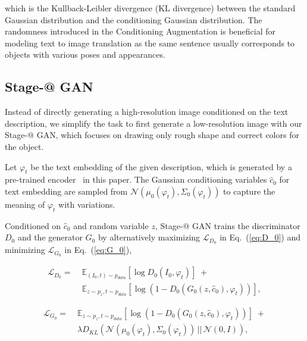 which is the Kullback-Leibler divergence (KL divergence) between the standard Gaussian distribution and the conditioning Gaussian distribution. The randomness introduced in the Conditioning Augmentation is beneficial for modeling text to image translation as the same sentence usually corresponds to objects with various poses and appearances. 

\subsection{Stage-\expandafter\@slowromancap{}@ GAN}

Instead of directly generating a high-resolution image conditioned on the text description, we simplify the task to first generate a low-resolution image with our Stage-\expandafter\@slowromancap{}@ GAN, which focuses on drawing only rough shape and correct colors for the object. 

Let $\varphi_{t}$ be the text embedding of the given description, which is generated by a pre-trained encoder~\cite{reed2016cvpr} in this paper. The Gaussian conditioning variables $\hat{c}_0$ for text embedding are sampled from $\mathcal{N}(\mu_0(\varphi_{t}), \Sigma_0(\varphi_{t}))$ to capture the meaning of $\varphi_{t}$ with variations. 

Conditioned on $\hat{c}_0$ and random variable $z$, Stage-\expandafter\@slowromancap{}@ GAN trains the discriminator $D_0$ and the generator $G_0$ by alternatively maximizing $\mathcal{L}_{D_0}$ in Eq.~(\ref{eq:D_0}) and minimizing $\mathcal{L}_{G_0}$ in Eq.~(\ref{eq:G_0}),

\begin{equation}\label{eq:D_0}
\begin{aligned}
\mathcal{L}_{D_0} =  &\; \mathbb{E}_{(I_{0},t) \sim {p_{data}}} [\log D_{0}(I_{0}, \varphi_{t})] \; + \\
&\; \mathbb{E}_{z \sim {p_{z}}, t \sim p_{data}} [\log(1 - D_{0}(G_{0}(z,\hat{c}_0), \varphi_{t}))],
\end{aligned}
\end{equation}

\begin{equation}\label{eq:G_0}
\begin{aligned}
\mathcal{L}_{G_0} = &\; \mathbb{E}_{z \sim {p_{z}}, t \sim p_{data}} [\log(1 - D_{0}(G_{0}(z,\hat{c}_0), \varphi_{t}))] \; + \\
                    &\; \lambda D_{KL}(\mathcal{N}(\mu_0(\varphi_{t}), \Sigma_0(\varphi_{t})) \, || \, \mathcal{N}(0, I)), 
\end{aligned}
\end{equation}

